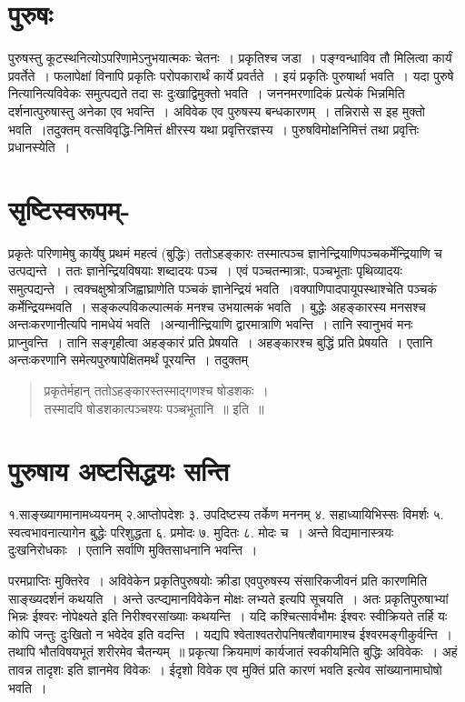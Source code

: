 {\section*{पुरुषः}

पुरुषस्तु कूटस्थनित्योऽपरिणामेऽनुभयात्मकः चेतनः~। प्रकृतिश्च जडा~। पङ्ग्वन्धाविव तौ मिलित्वा कार्यं प्रवर्तेते~। फलापेक्षां विनापि प्रकृतिः परोपकारार्थं कार्ये प्रवर्तते~। इयं प्रकृतिः पुरुषार्था भवति~। यदा पुरुषे नित्यानित्यविवेकः समुत्पद्यते तदा सः दुःखाद्विमुक्तो भवति~। जननमरणादिकं प्रत्येकं भिन्नमिति दर्शनात्पुरुषास्तु अनेका एव भवन्ति~। अविवेक एव पुरुषस्य बन्धकारणम्~। तन्निरासे स इह मुक्तो भवति~।तदुक्तम्\enginline{-} वत्सविवृद्धि-निमित्तं क्षीरस्य यथा प्रवृत्तिरज्ञस्य~। पुरुषविमोक्षनिमित्तं तथा प्रवृत्तिः प्रधानस्येति~। 

\section*{सृष्टिस्वरूपम्-} 

प्रकृतेः परिणामेषु कार्येषु प्रथमं महत्वं (बुद्धिः)  ततोऽहङ्कारः  तस्मात्पञ्च ज्ञानेन्द्रियाणि\break पञ्चकर्मेन्द्रियाणि च उत्पद्यन्ते~। ततः ज्ञानेन्द्रियविषयाः शब्दादयः पञ्च~। एवं पञ्चतन्मात्राः, पञ्चभूताः पृथिव्यादयः समुत्पद्यन्ते~। त्वक्चक्षुश्रोत्रजिह्वाघ्राणेति पञ्चकं ज्ञानेन्द्रियं भवति~।\break वक्पाणिपादपायूपस्थाश्चेति पञ्चकं कर्मेन्द्रियम्भवति~। सङ्कल्पविकल्पात्मकं मनश्च उभयात्मकं भवति~। बुद्धेः अहङ्कारस्य मनसश्च अन्तःकरणानीत्यपि नामधेयं भवति~।\break अन्यानीन्द्रियाणि द्वारमात्राणि भवन्ति~। तानि स्वानुभवं मनः प्राप्नुवन्ति~। तानि सङ्गृहीत्वा अहङ्कारं प्रति प्रेषयति~। अहङ्कारश्च बुद्धिं प्रति प्रेषयति~। एतानि अन्तःकरणानि समेत्य\break पुरुषापेक्षितमर्थं पूरयन्ति~। तदुक्तम् 
\begin{verse}
प्रकृतेर्महान् ततोऽहङ्कारस्तस्माद्गणश्च षोडशकः~। \\
तस्मादपि षोडशकात्पञ्चश्यः पञ्चभूतानि~॥ इति~॥
\end{verse}
\vskip -48pt

\section*{पुरुषाय अष्टसिद्धयः सन्ति}
\vskip -5pt

१.साङ्ख्यागमानामध्ययनम् 	२.आप्तोपदेशः ३.  उपदिष्टस्य तर्केण मननम्
४. सहाध्यायिभिस्सः विमर्शः 	५. स्वत्वभावनात्यागेन बुद्धेः परिशुद्धता	६. प्रमोदः
७. मुदितः	८. मोदः च~। अन्ते विद्यमानास्त्रयः दुःखनिरोधकाः~। एतानि सर्वाणि मुक्तिसाधनानि भवन्ति~। 

परमप्राप्तिः मुक्तिरेव~। अविवेकेन प्रकृतिपुरुषयोः क्रीडा एवपुरुषस्य संसारिकजीवनं प्रति कारणमिति साङ्ख्यदर्शनं कथयति~। अन्ते उत्प्द्यमानविवेकेन मोक्षः लभ्यते इत्यपि सूचयति~। अतः प्रकृतिपुरुषाभ्यां भिन्नः ईश्वरः नोपेक्ष्यते इति निरीश्वरसांख्याः कथयन्ति~। यदि कश्चित्सार्वभौमः ईश्वरः स्वीक्रियते तर्हि यः कोपि जन्तुः दुःखितो न भवेदेव इति वदन्ति~। यद्यपि श्वेताश्वतरोपनिषत्शैवागमाश्च ईश्वरमङ्गीकुर्वन्ति~। तथापि भौतविषयभूतं शरीरमेव चैतन्यम्~॥ प्रकृत्या क्रियमाणं कार्यजातं स्वकीयमिति बुद्धिः अविवेकः~। अहं तावन्न तादृशः इति ज्ञानमेव विवेकः~। ईदृशो विवेक एव मुक्तिं प्रति कारणं भवति इत्येव सांख्यानामाघोषो भवति~। 

\centerline{{\fontsize{10}{12}\selectfont{}\quad{}\quad{}}}
}
